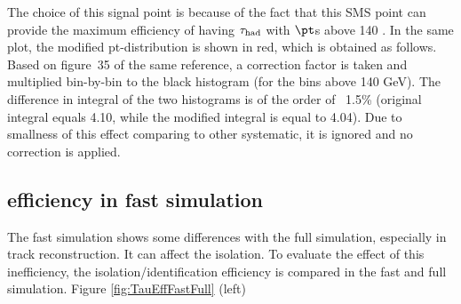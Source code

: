  The choice of this signal point is because of the fact that this SMS point can provide the maximum efficiency of 
having $\tau_{\rm had}$ with $\pt$s above 140 \GeV.  In the same plot, the modified pt-distribution is shown in red, 
which is obtained as follows. Based on figure~35 of the same reference, a correction factor is taken and 
multiplied bin-by-bin to the black histogram (for the bins above 140 GeV). The difference in integral
of the two histograms is of the order of ~1.5\% (original integral equals 4.10, while the modified integral is equal to 4.04).
Due to smallness of this effect comparing to other systematic, it is ignored and no correction is applied. 


\subsection{\texorpdfstring{\Tau efficiency in fast simulation}{Tau efficiency in fast simulation}}
The fast simulation shows some differences with the full simulation, especially in track reconstruction. It can affect the \Tau isolation.
To evaluate the effect of this inefficiency, the \Tau isolation/identification efficiency  is compared in the fast and full simulation.
Figure \ref{fig:TauEffFastFull} (left)

